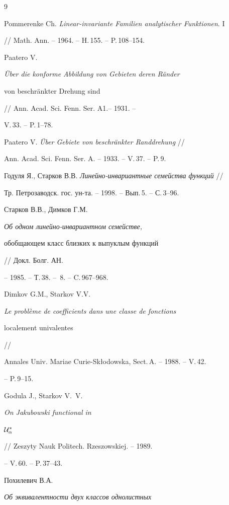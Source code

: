\begin{thebibliography}{9}







Pommerenke Ch. {\em Linear-invariante Familien analytischer Funktionen}. I


//  Math. Ann. -- 1964. -- H.\,155. -- P.\,108--154.




Paatero V. {\em \"Uber die konforme Abbildung von Gebieten deren R\"ander


von beschr\"ankter Drehung sind} // Ann. Acad. Sci. Fenn. Ser. A1.-- 1931. --


V.\,33. -- P.\,1--78.




Paatero V. {\em \"Uber Gebiete von beschr\"ankter Randdrehung} //


Ann. Acad. Sci. Fenn. Ser. A. -- 1933. -- V.\,37. -- P.\,9.




Годуля Я., Старков В.В. {\em Линейно-инвариантные семейства функций} //


Тр. Петрозаводск. гос. ун-та. -- 1998. -- Вып.\,5. -- С.\,3--96.




Старков В.В., Димков Г.М. {\em Об одном линейно-инвариантном семействе,


обобщающем класс близких к выпуклым функций} // Докл. Болг. АН.


-- 1985. -- Т.\,38. -- \No\,8. -- C.\,967--968.




Dimkov G.M., Starkov V.V.


{\em Le probl\`eme de coefficients dans une classe de fonctions


localement univalentes} //


Annales Univ. Mariae Curie-Sk\l odowska, Sect.\,A. -- 1988. -- V.\,42.


-- P.\,9--15.




Godula J., Starkov V.~V. {\em On Jakubowski functional in


$\cal U^\ast_\alpha$} // Zeszyty Nauk Politech. Rzeszowskiej. -- 1989.


-- V.\,60. -- P.\,37--43.




Похилевич В.А. {\em Об эквивалентности двух классов однолистных


}
\end{thebibliography}
